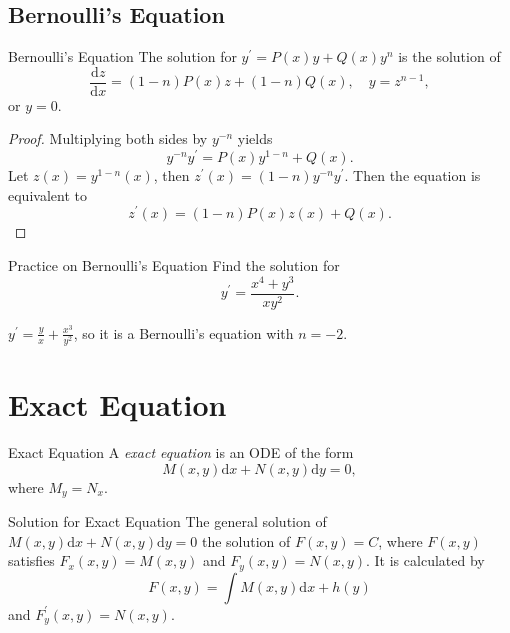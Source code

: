 \subsection{Bernoulli's Equation}

\begin{proposition}{Bernoulli's Equation}{}
  The solution for $y^{\prime} = P(x) y + Q(x) y^n$ is the solution of
  \begin{equation}
    \frac{\mathrm{d} z}{\mathrm{d} x} = (1-n)P(x)z + (1-n)Q(x), \quad y = z^{n-1},
  \end{equation}
  or $y = 0$.
\end{proposition}

\begin{proof}
  Multiplying both sides by $y^{-n}$ yields
  \begin{equation}
    y^{-n}y^{\prime} = P(x)y^{1-n} + Q(x).
  \end{equation}
  Let $z(x) = y^{1-n}(x)$, then $z^{\prime}(x) = (1-n)y^{-n}y^{\prime}$. Then the equation is equivalent to
  \begin{equation}
    z^{\prime}(x) = (1-n)P(x)z(x) + Q(x).
  \end{equation}
\end{proof}

\begin{example}{Practice on Bernoulli's Equation}{}
  Find the solution for
  \begin{equation}
    y^{\prime} = \frac{x^4 + y^3}{xy^2}.
  \end{equation}
\end{example}

\begin{solution}
  $y^{\prime} = \frac{y}{x} + \frac{x^3}{y^2}$, so it is a Bernoulli's equation with $n = -2$.
\end{solution}

\section{Exact Equation}

\begin{definition}{Exact Equation}{}
  A \emph{exact equation} is an ODE of the form
  \begin{equation}
    M(x,y)\mathrm{d} x + N(x,y)\mathrm{d} y = 0,
  \end{equation}
  where $M_y = N_x$.
\end{definition}

\begin{proposition}{Solution for Exact Equation}{}
  The general solution of $M(x,y)\mathrm{d}x + N(x,y)\mathrm{d} y = 0$
  the solution of $F(x,y) = C$, where $F(x,y)$ satisfies $F_x(x,y) = M(x,y)$ and $F_y(x,y)=N(x,y)$.
  It is calculated by
  \begin{equation}
    F(x,y) = \int M(x,y)\mathrm{d} x + h(y)
  \end{equation}
  and $F^{\prime}_y(x,y) = N(x,y)$.
\end{proposition}

